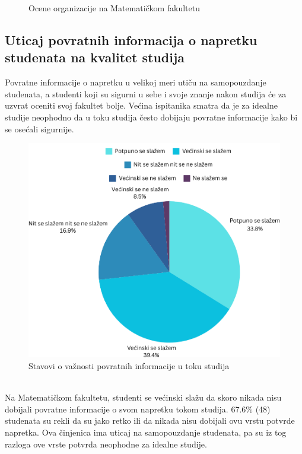 \documentclass[a4paper]{article}
\begin{document}
{\begin{figure}[h!]
\begin{center}
    \caption{Ocene organizacije na Matematičkom fakultetu}
    \label{fig:organizacija_matf}
\end{center}
\end{figure}


\subsection{Uticaj povratnih informacija o napretku studenata na kvalitet studija}
\label{subsec:podnaslov2}

Povratne informacije o napretku u velikoj meri utiču na samopouzdanje studenata, a studenti koji su sigurni u sebe i svoje znanje nakon studija će za uzvrat oceniti svoj fakultet bolje. Većina ispitanika smatra da je za idealne studije neophodno da u toku studija često dobijaju povratne informacije kako bi se osećali sigurnije. \\
\begin{figure}[h!]
\begin{center}
    \includegraphics[scale = 0.3]{PieChartPovratneInformacije.png}
    \caption{Stavovi o važnosti povratnih informacije u toku studija}
    \label{fig:povratne_informacije}
\end{center}
\end{figure}
\\Na Matematičkom fakultetu, studenti se većinski slažu da skoro nikada nisu dobijali povratne informacije o svom napretku tokom studija. 67.6\% (48) studenata su rekli da su jako retko ili da nikada nisu dobijali ovu vrstu potvrde napretka. Ova činjenica ima uticaj na samopouzdanje studenata, pa su iz tog razloga ove vrste potvrda neophodne za idealne studije. \\
}
\end{document}
